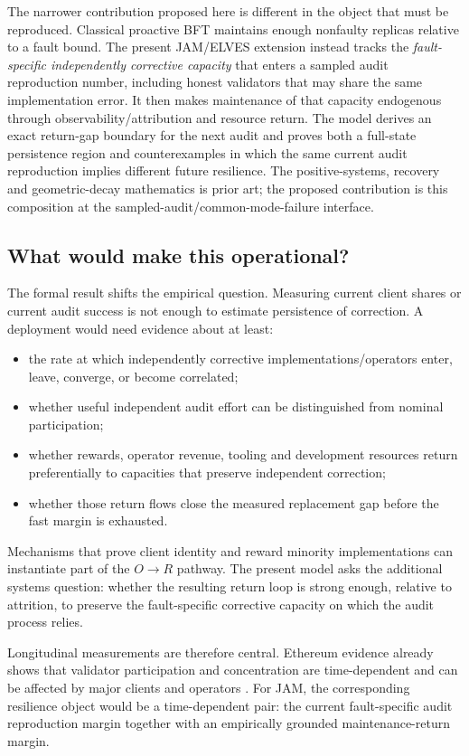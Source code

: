 The narrower contribution proposed here is different in the object that must be reproduced. Classical proactive BFT maintains enough nonfaulty replicas relative to a fault bound. The present JAM/ELVES extension instead tracks the \emph{fault-specific independently corrective capacity} that enters a sampled audit reproduction number, including honest validators that may share the same implementation error. It then makes maintenance of that capacity endogenous through observability/attribution and resource return. The model derives an exact return-gap boundary for the next audit and proves both a full-state persistence region and counterexamples in which the same current audit reproduction implies different future resilience. The positive-systems, recovery and geometric-decay mathematics is prior art; the proposed contribution is this composition at the sampled-audit/common-mode-failure interface.

\subsection{What would make this operational?}

The formal result shifts the empirical question. Measuring current client shares or current audit success is not enough to estimate persistence of correction. A deployment would need evidence about at least:
\begin{itemize}
\item the rate at which independently corrective implementations/operators enter, leave, converge, or become correlated;
\item whether useful independent audit effort can be distinguished from nominal participation;
\item whether rewards, operator revenue, tooling and development resources return preferentially to capacities that preserve independent correction;
\item whether those return flows close the measured replacement gap before the fast margin is exhausted.
\end{itemize}

Mechanisms that prove client identity and reward minority implementations \citep{ron2026} can instantiate part of the $O\to R$ pathway. The present model asks the additional systems question: whether the resulting return loop is strong enough, relative to attrition, to preserve the fault-specific corrective capacity on which the audit process relies.

Longitudinal measurements are therefore central. Ethereum evidence already shows that validator participation and concentration are time-dependent and can be affected by major clients and operators \citep{grandjean2023}. For JAM, the corresponding resilience object would be a time-dependent pair: the current fault-specific audit reproduction margin together with an empirically grounded maintenance-return margin.
